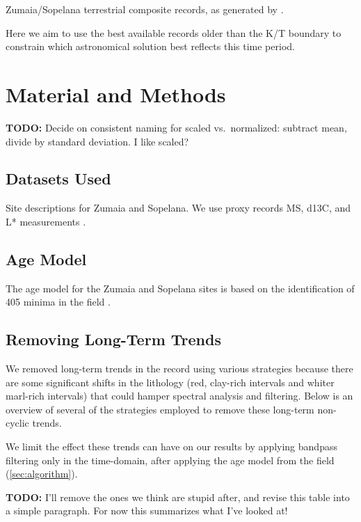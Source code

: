 \documentclass[draft]{agujournal2019}
\begin{document}
Zumaia/Sopelana terrestrial composite records, as generated by .

Here we aim to use the best available records older than the K/T boundary to constrain which astronomical solution best reflects this time period.


\section{Material and Methods}\label{sec:mm}

\textbf{TODO:} Decide on consistent naming for scaled vs.\ normalized: subtract mean, divide by standard deviation. I like scaled?

\subsection{Datasets Used}\label{sec:data}

Site descriptions for Zumaia and Sopelana.
We use proxy records \gls{MS}, \gls{d13C}, and \gls{L*} measurements  \cite{Batenburg2012,Batenburg2014}.

\subsection{Age Model}\label{sec:agemodel}

The age model for the Zumaia and Sopelana sites is based on the identification of \qty{405}{\kiloyear} minima in the field .

\subsection{Removing Long-Term Trends}\label{sec:detrend}

We removed long-term trends in the record using various strategies because there are some significant shifts in the lithology (red, clay-rich intervals and whiter marl-rich intervals) that could hamper spectral analysis and filtering.
Below is an overview of several of the strategies employed to remove these long-term non-cyclic trends.

We limit the effect these trends can have on our results by applying bandpass filtering only in the time-domain, after applying the age model from the field (\cref{sec:algorithm}).

\textbf{TODO:} I'll remove the ones we think are stupid after, and revise this table into a simple paragraph. For now this summarizes what I've looked at!
\end{document}
